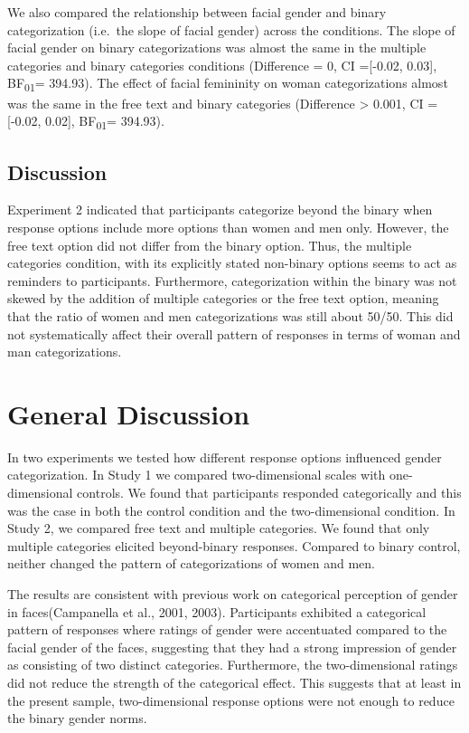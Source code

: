 \documentclass[
  man,
  longtable,
  nolmodern,
  notxfonts,
  notimes,
  colorlinks=true,linkcolor=blue,citecolor=blue,urlcolor=blue]{apa7}
\begin{document}
We also compared the relationship between facial gender and binary
categorization (i.e.~the slope of facial gender) across the conditions.
The slope of facial gender on binary categorizations was almost the same
in the multiple categories and binary categories conditions (Difference
= 0, CI ={[}-0.02, 0.03{]}, BF\textsubscript{01}= 394.93). The effect of
facial femininity on woman categorizations almost was the same in the
free text and binary categories (Difference \textgreater{} 0.001, CI
={[}-0.02, 0.02{]}, BF\textsubscript{01}= 394.93).

\subsection{Discussion}\label{discussion-1}

Experiment 2 indicated that participants categorize beyond the binary
when response options include more options than women and men only.
However, the free text option did not differ from the binary option.
Thus, the multiple categories condition, with its explicitly stated
non-binary options seems to act as reminders to participants.
Furthermore, categorization within the binary was not skewed by the
addition of multiple categories or the free text option, meaning that
the ratio of women and men categorizations was still about 50/50. This
did not systematically affect their overall pattern of responses in
terms of woman and man categorizations.

\section{General Discussion}\label{general-discussion}

In two experiments we tested how different response options influenced
gender categorization. In Study 1 we compared two-dimensional scales
with one-dimensional controls. We found that participants responded
categorically and this was the case in both the control condition and
the two-dimensional condition. In Study 2, we compared free text and
multiple categories. We found that only multiple categories elicited
beyond-binary responses. Compared to binary control, neither changed the
pattern of categorizations of women and men.

The results are consistent with previous work on categorical perception
of gender in faces(Campanella et al., 2001, 2003). Participants
exhibited a categorical pattern of responses where ratings of gender
were accentuated compared to the facial gender of the faces, suggesting
that they had a strong impression of gender as consisting of two
distinct categories. Furthermore, the two-dimensional ratings did not
reduce the strength of the categorical effect. This suggests that at
least in the present sample, two-dimensional response options were not
enough to reduce the binary gender norms.
\end{document}
